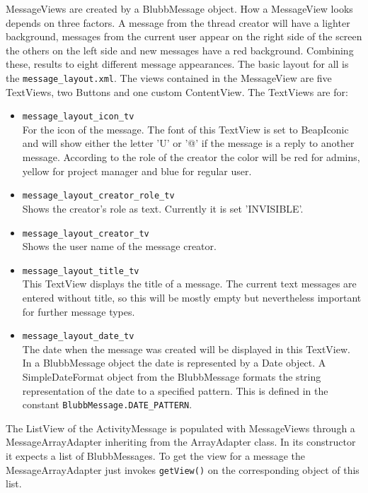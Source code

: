 \documentclass[12pt,a4paper,oneside]{report}
\newcommand{\code}[1]{\lstinline{#1}}
\begin{document}
MessageViews are created by a BlubbMessage object.
How a MessageView looks depends on three factors. A message from the thread creator will have a lighter background, messages from the current user appear on the right side of the screen the others on the left side and new messages have a red background. Combining these, results to eight different message appearances.
The basic layout for all is the \code{message_layout.xml}. The views contained in the MessageView are five TextViews, two Buttons and one custom ContentView.
The TextViews are for:
\begin{itemize}
\item \code{message_layout_icon_tv}\\
For the icon of the message. The font of this TextView is set to BeapIconic and will show either the letter 'U' or '@' if the message is a reply to another message. According to the role of the creator the color will be red for admins, yellow for project manager and blue for regular user.

\item \code{message_layout_creator_role_tv}\\
Shows the creator's role as text. Currently it is set 'INVISIBLE'.

\item \code{message_layout_creator_tv}\\
Shows the user name of the message creator.

\item \code{message_layout_title_tv}\\
This TextView displays the title of a message. The current text messages are entered without title, so this will be mostly empty but nevertheless important for further message types.

\item \code{message_layout_date_tv}\\
The date when the message was created will be displayed in this TextView. In a BlubbMessage object the date is represented by a Date object. A SimpleDateFormat object from the BlubbMessage formats the string representation of the date to a specified pattern. This is defined in the constant \code{BlubbMessage.DATE_PATTERN}.

\end{itemize}

The ListView of the ActivityMessage is populated with MessageViews through a MessageArrayAdapter inheriting from the ArrayAdapter class. 
In its constructor it expects a list of BlubbMessages. To get the view for a message the MessageArrayAdapter just invokes \code{getView()} on the corresponding object of this list. 
\end{document}
